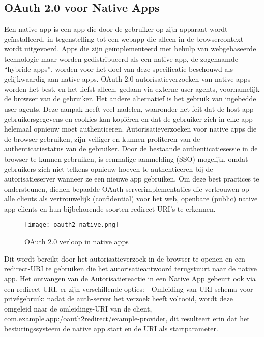   \subsection{OAuth 2.0 voor Native Apps}%
  \label{subsec:oauth-2.0-voor-native-apps}
  \autocite{Denniss2017}
  Een native app is een app die door de gebruiker op zijn apparaat wordt geïnstalleerd, in tegenstelling tot een webapp die alleen in de browsercontext wordt uitgevoerd. Apps die zijn geïmplementeerd met behulp van webgebaseerde technologie maar worden gedistribueerd als een native app, de zogenaamde ``hybride apps'', worden voor het doel van deze specificatie beschouwd als gelijkwaardig aan native apps.
  OAuth 2.0-autorisatieverzoeken van native apps worden het best, en het liefst alleen, gedaan via externe user-agents, voornamelijk de browser van de gebruiker. Het andere alternatief is het gebruik van ingebedde user-agents. Deze aanpak heeft veel nadelen, waaronder het feit dat de host-app gebruikersgegevens en cookies kan kopiëren en dat de gebruiker zich in elke app helemaal opnieuw moet authenticeren. Autorisatieverzoeken voor native apps die de browser gebruiken, zijn veiliger en kunnen profiteren van de authenticatiestatus van de gebruiker. Door de bestaande authenticatiesessie in de browser te kunnen gebruiken, is eenmalige aanmelding (SSO) mogelijk, omdat gebruikers zich niet telkens opnieuw hoeven te authenticeren bij de autorisatieserver wanneer ze een nieuwe app gebruiken.
  Om deze best practices te ondersteunen, dienen bepaalde OAuth-serverimplementaties die vertrouwen op alle clients als vertrouwelijk (confidential) voor het web, openbare (public) native app-clients en hun bijbehorende soorten redirect-URI's te erkennen.
  \begin{figure}[h]
    \centering
    \texttt{[image: oauth2\_native.png]}
    \caption{OAuth 2.0 verloop in native apps}
    \label{fig:example2}
  \end{figure}
  \newline
  Dit wordt bereikt door het autorisatieverzoek in de browser te openen en een redirect-URI te gebruiken die het autorisatieantwoord terugstuurt naar de native app.
  \newline
  \newline
  Het ontvangen van de Autorisatiereactie in een Native App gebeurt ook via een redirect URI, er zijn verschillende opties:
  \newline
  - Omleiding van URI-schema voor privégebruik: nadat de auth-server het verzoek heeft voltooid, wordt deze omgeleid naar de omleidings-URI van de client, com.example.app:/oauth2redirect/example-provider, dit resulteert erin dat het besturingssysteem de native app start en de URI als startparameter.

